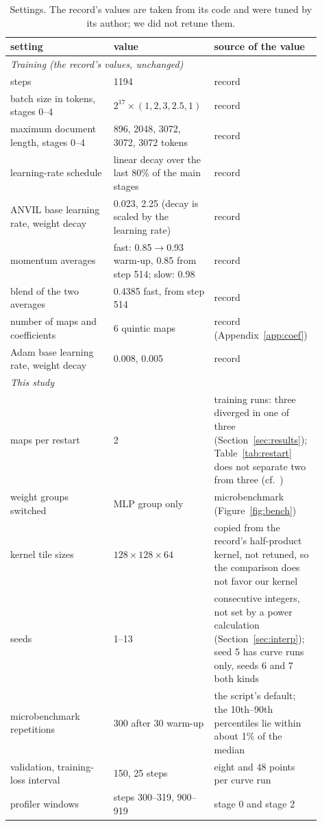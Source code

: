 \documentclass{article}
\begin{document}
\begin{table}[!htbp]\centering\small
\begin{tabular}{p{0.32\linewidth}p{0.25\linewidth}p{0.33\linewidth}}\toprule
setting & value & source of the value\\\midrule
\multicolumn{3}{l}{\emph{Training (the record's values, unchanged)}}\\
steps & 1194 & record\\
batch size in tokens, stages 0--4 & $2^{17}\times(1,2,3,2.5,1)$ & record\\
maximum document length, stages 0--4 & 896, 2048, 3072, 3072, 3072 tokens & record\\
learning-rate schedule & linear decay over the last 80\% of the main stages & record\\
ANVIL base learning rate, weight decay & 0.023, 2.25 (decay is scaled by the learning rate) & record\\
momentum averages & fast: 0.85$\to$0.93 warm-up, 0.85 from step 514; slow: 0.98 & record\\
blend of the two averages & 0.4385 fast, from step 514 & record\\
number of maps and coefficients & 6 quintic maps & record (Appendix~\ref{app:coef})\\
Adam base learning rate, weight decay & 0.008, 0.005 & record\\\midrule
\multicolumn{3}{l}{\emph{This study}}\\
maps per restart & 2 & training runs: three diverged in one of three (Section~\ref{sec:results}); Table~\ref{tab:restart} does not separate two from three (cf.~\cite{gramns})\\
weight groups switched & MLP group only & microbenchmark (Figure~\ref{fig:bench})\\
kernel tile sizes & $128\times128\times64$ & copied from the record's half-product kernel, not retuned, so the comparison does not favor our kernel\\
seeds & 1--13 & consecutive integers, not set by a power calculation (Section~\ref{sec:interp}); seed 5 has curve runs only, seeds 6 and 7 both kinds\\
microbenchmark repetitions & 300 after 30 warm-up & the script's default; the 10th--90th percentiles lie within about 1\% of the median\\
validation, training-loss interval & 150, 25 steps & eight and 48 points per curve run\\
profiler windows & steps 300--319, 900--919 & stage 0 and stage 2\\\bottomrule
\end{tabular}
\caption{Settings. The record's values are taken from its code and were tuned by its author; we did not retune them.}\label{tab:hyper}
\end{table}
\end{document}
